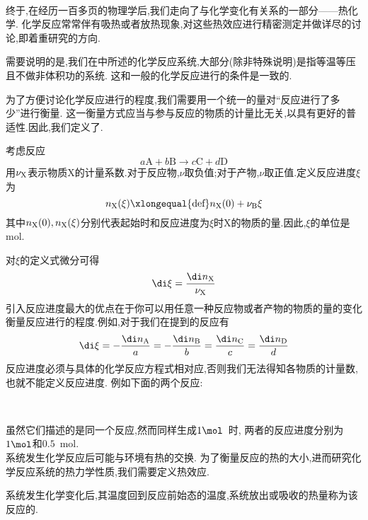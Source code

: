 \documentclass{ctexart}
\begin{document}
\pagestyle{plain}
\noindent{}\vspace{15pt}\\
\indent 终于,在经历一百多页的物理学后,我们走向了与化学变化有关系的一部分——热化学.%
化学反应常常伴有吸热或者放热现象,对这些热效应进行精密测定并做详尽的讨论,即着重研究的方向.
\begin{hint}
    需要说明的是,我们在中所述的化学反应系统,大部分(除非特殊说明)是指等温等压且不做非体积功的系统.%
    这和一般的化学反应进行的条件是一致的.
\end{hint}\vspace{8pt}
\indent 为了方便讨论化学反应进行的程度,我们需要用一个统一的量对“反应进行了多少”进行衡量.%
这一衡量方式应当与参与反应的物质的计量比无关,以具有更好的普适性.因此,我们定义了.
\begin{definition}[5A.1.1 反应进度]
    考虑反应
    \[a\text{A}+b\text{B}\longrightarrow c\text{C}+d\text{D}\]
    用$\nu_{\text X}$表示物质X的计量系数.对于反应物,$\nu$取负值;对于产物,$\nu$取正值.定义反应进度$\xi$为
    \[n_\text X(\xi)\xlongequal{\text{def}}n_\text X(0)+\nu_\text B\xi\]
    其中$n_\text X(0),n_\text X(\xi)$分别代表起始时和反应进度为$\xi$时X的物质的量.因此,$\xi$的单位是mol.
\end{definition}
对$\xi$的定义式微分可得
\[\di\xi=\dfrac{\di n_\text X}{\nu_\text X}\]
\indent 引入反应进度最大的优点在于你可以用任意一种反应物或者产物的物质的量的变化衡量反应进行的程度.例如,对于我们在提到的反应有
\[\di\xi=-\dfrac{\di n_\text A}{a}=-\dfrac{\di n_\text B}{b}=\dfrac{\di n_\text C}{c}=\dfrac{\di n_\text D}{d}\]
\indent 反应进度必须与具体的化学反应方程式相对应,否则我们无法得知各物质的计量数,也就不能定义反应进度.%
例如下面的两个反应:
\begin{tightcenter}
    \\
\end{tightcenter}
虽然它们描述的是同一个反应,然而同样生成$1\mol$\ 时,%
两者的反应进度分别为$1\mol$和$0.5$\ mol.\vspace{4pt}\\
\indent 系统发生化学反应后可能与环境有热的交换.%
为了衡量反应的热的大小,进而研究化学反应系统的热力学性质,我们需要定义热效应.
\begin{definition}[5A.1.2 热效应]
    系统发生化学变化后,其温度回到反应前始态的温度,系统放出或吸收的热量称为该反应的.
\end{definition}
\end{document}
